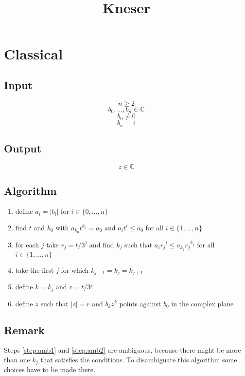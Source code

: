 \documentclass{article}
\def\CC{\mathbb{C}}
\begin{document}
\title{Kneser}
\author{}
\date{}
\maketitle

\section{Classical}

\subsection{Input}

$$n\ge 2$$
$$b_0,\ldots,b_n\in\CC$$
$$b_0 \ne 0$$
$$b_n = 1$$

\subsection{Output}

$$z\in\CC$$

\subsection{Algorithm}

\begin{enumerate}
\item define $a_i = |b_i|$ for $i\in\{0,\ldots,n\}$
\item\label{step:amb1} find $t$ and $k_0$ with $a_{k_0} t^{k_0} = a_0$ and
$a_i t^i \le a_0$ for all $i\in\{1,\ldots,n\}$
\item\label{step:amb2} for each $j$ take $r_j = t/3^j$ and
find $k_j$ such that $a_i {r_j}^i \le a_{k_j} {r_j}^{k_j}$ for all $i\in\{1,\ldots,n\}$
\item take the first $j$ for which $k_{j-1} = k_j = k_{j+1}$
\item define $k = k_j$ and $r = t/3^j$
\item\label{step:und} define $z$ such that $|z| = r$ and $b_k z^k$ points against $b_0$
in the complex plane
\end{enumerate}

\subsection{Remark}

Steps \ref{step:amb1} and \ref{step:amb2} are ambiguous, because there might
be more than one $k_j$ that satisfies the conditions.  To disambiguate this
algorithm some choices have to be made there.
\end{document}
